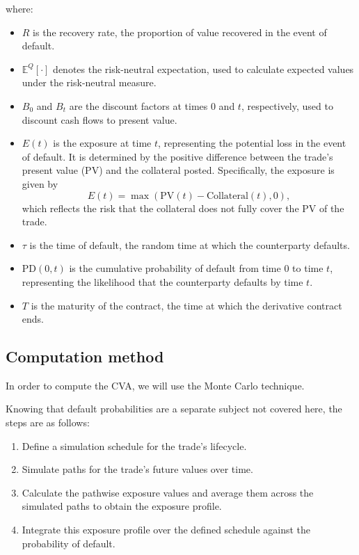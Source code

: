 \documentclass{article}
\begin{document}
where:
\begin{itemize}
    \item $R$ is the recovery rate, the proportion of value recovered in the event of default.
    \item $\mathbb{E}^Q[\cdot]$ denotes the risk-neutral expectation, used to calculate expected values under the risk-neutral measure.
    \item $B_0$ and $B_t$ are the discount factors at times 0 and $t$, respectively, used to discount cash flows to present value.
    \item $E(t)$ is the exposure at time $t$, representing the potential loss in the event of default. It is determined by the positive difference between the trade's present value (PV) and the collateral posted. Specifically, the exposure is given by 
    \[
    E(t) = \max(\text{PV}(t) - \text{Collateral}(t), 0),
    \]
    which reflects the risk that the collateral does not fully cover the PV of the trade.
    
    \item $\tau$ is the time of default, the random time at which the counterparty defaults.
    \item $\text{PD}(0, t)$ is the cumulative probability of default from time 0 to time $t$, representing the likelihood that the counterparty defaults by time $t$.
    \item $T$ is the maturity of the contract, the time at which the derivative contract ends.
\end{itemize}

\subsection{Computation method}

In order to compute the CVA, we will use the Monte Carlo technique.

Knowing that default probabilities are a separate subject not covered here, the steps are as follows:
\begin{enumerate}
    \item Define a simulation schedule for the trade's lifecycle.
    \item Simulate paths for the trade's future values over time.
    \item Calculate the pathwise exposure values and average them across the simulated paths to obtain the exposure profile.
    \item Integrate this exposure profile over the defined schedule against the probability of default.
\end{enumerate}
\end{document}
